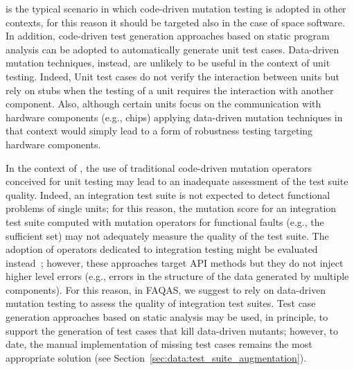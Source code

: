 
 is the typical scenario in which code-driven mutation testing is adopted in other contexts, for this reason it should be targeted also in the case of space software.
In addition, code-driven test generation approaches based on static program analysis can be adopted to automatically generate unit test cases.
Data-driven mutation techniques, instead, are unlikely to be useful in the context of unit testing.
Indeed, Unit test cases do not verify the interaction between units but rely on stubs when the testing of  a unit requires the interaction with another component.
Also, although certain units focus on the communication with hardware components (e.g., chips) applying data-driven mutation techniques in that context would simply lead to a form of robustness testing targeting hardware components.


In the context of , the use of traditional code-driven mutation operators conceived for unit testing may lead to an inadequate assessment of the test suite quality.
Indeed, an integration test suite is not expected to detect functional problems of single units; for this reason, the mutation score for an integration test suite computed with mutation operators for functional faults (e.g., the sufficient set) may not adequately measure the quality of the test suite.
The adoption of operators dedicated to integration testing might be evaluated instead~\cite{grechanik2016mutation,delamaro2001proteum}; however, these approaches target API methods but they do not inject higher level errors (e.g., errors in the structure of the data generated by multiple components). For this reason, in FAQAS, we suggest to rely on data-driven mutation testing to assess the quality of integration test suites. Test case generation approaches based on static analysis may be used, in principle, to support the generation of test cases that kill data-driven mutants; however, to date, the manual implementation of missing test cases remains the most appropriate solution  (see Section~\ref{sec:data:test_suite_augmentation}).


